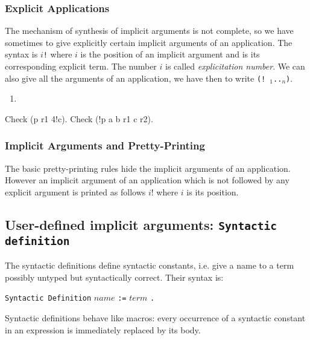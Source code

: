 {\begin{coq_example}
\subsubsection{Explicit Applications}

The mechanism of synthesis of implicit arguments is not complete, so
we have sometimes to give explicitly certain implicit arguments of an
application. The syntax is {\tt $i$!}{\term} where $i$ is the position
of an implicit argument and {\term} is its corresponding explicit
term. The number $i$ is called {\em explicitation number}.  We can
also give all the arguments of an application, we have then to write
{\tt (!{\ident}~{\term}$_1$..{\term}$_n$)}.

\ErrMsg
\begin{enumerate}
\item {}
\end{enumerate}

\Example

\begin{coq_example}
Check (p r1 4!c).
Check (!p a b r1 c r2).
\end{coq_example}

\subsubsection{Implicit Arguments and Pretty-Printing}

The basic pretty-printing rules hide the implicit arguments of an
application. However an implicit argument {\term} of an application
which is not followed by any explicit argument is printed as follows
$i!${\term} where $i$ is its position.

\subsection{User-defined implicit arguments: {\tt Syntactic definition}}
\label{Syntactic-Definition}

The syntactic definitions define syntactic constants, i.e. give a name
to a term possibly untyped but syntactically correct. Their syntax
is:

\begin{center}
\verb+Syntactic Definition+ $name$ \verb+:=+ $term$ \verb+.+ \\
\end{center}

Syntactic definitions behave like macros: every occurrence of a
syntactic constant in an expression is immediately replaced by its
body.


\end{coq_example}}
